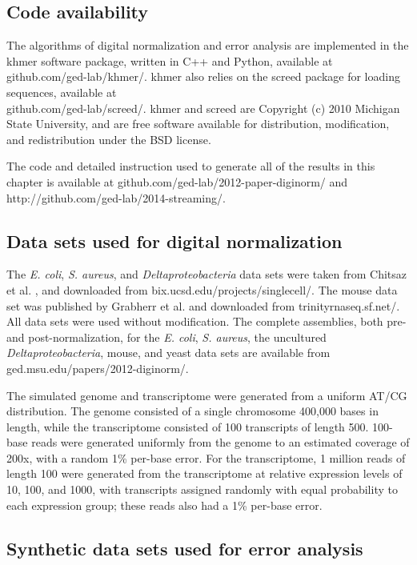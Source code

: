 \subsection{Code availability}
The algorithms of digital normalization and error analysis are implemented 
 in the khmer software
package, written in C++ and Python, available at github.com/ged-lab/khmer/.
 khmer also relies on the screed package for loading
sequences, available at \\
github.com/ged-lab/screed/.
khmer and screed are Copyright (c) 2010 Michigan State University, and are free
software available for distribution, modification, and redistribution under the
BSD license.

The code and detailed instruction used to generate all of the results in this chapter is available at
github.com/ged-lab/2012-paper-diginorm/ and 
http://github.com/ged-lab/2014-streaming/. 

\subsection{Data sets used for digital normalization}

The {\em E. coli}, {\em S. aureus}, and {\em Deltaproteobacteria} data sets
were taken from Chitsaz et al. \cite{pubmed21926975}, and downloaded from
bix.ucsd.edu/projects/singlecell/.  The mouse data set was published by
Grabherr et al. \cite{pubmed21572440} and downloaded from
trinityrnaseq.sf.net/.  All data sets were used without modification. The
complete assemblies, both pre- and post-normalization, for the {\em E. coli},
{\em S. aureus}, the uncultured {\em Deltaproteobacteria}, mouse, and yeast
data sets are available from ged.msu.edu/papers/2012-diginorm/.

The simulated genome and transcriptome were generated from a uniform AT/CG
distribution.  The genome consisted of a single chromosome 400,000 bases in
length, while the transcriptome consisted of 100 transcripts of length 500.
100-base reads were generated uniformly from the genome to an estimated
coverage of 200x, with a random 1\% per-base error.  For the transcriptome, 1
million reads of length 100 were generated from the transcriptome at relative
expression levels of 10, 100, and 1000, with transcripts assigned randomly with
equal probability to each expression group; these reads also had a 1\% per-base
error.


\subsection{Synthetic data sets used for error analysis}

